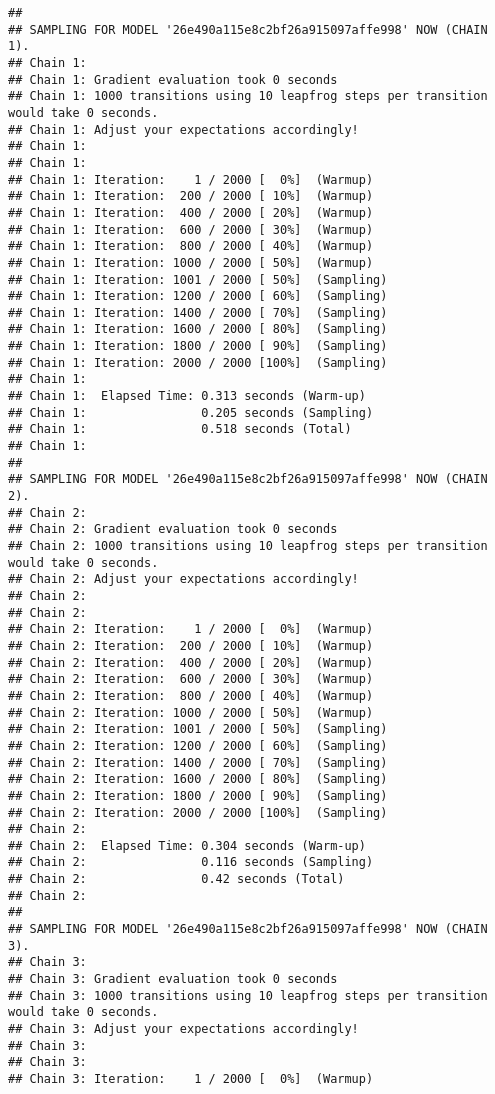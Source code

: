 \documentclass[
]{article}
\begin{document}
\begin{verbatim}
## 
## SAMPLING FOR MODEL '26e490a115e8c2bf26a915097affe998' NOW (CHAIN 1).
## Chain 1: 
## Chain 1: Gradient evaluation took 0 seconds
## Chain 1: 1000 transitions using 10 leapfrog steps per transition would take 0 seconds.
## Chain 1: Adjust your expectations accordingly!
## Chain 1: 
## Chain 1: 
## Chain 1: Iteration:    1 / 2000 [  0%]  (Warmup)
## Chain 1: Iteration:  200 / 2000 [ 10%]  (Warmup)
## Chain 1: Iteration:  400 / 2000 [ 20%]  (Warmup)
## Chain 1: Iteration:  600 / 2000 [ 30%]  (Warmup)
## Chain 1: Iteration:  800 / 2000 [ 40%]  (Warmup)
## Chain 1: Iteration: 1000 / 2000 [ 50%]  (Warmup)
## Chain 1: Iteration: 1001 / 2000 [ 50%]  (Sampling)
## Chain 1: Iteration: 1200 / 2000 [ 60%]  (Sampling)
## Chain 1: Iteration: 1400 / 2000 [ 70%]  (Sampling)
## Chain 1: Iteration: 1600 / 2000 [ 80%]  (Sampling)
## Chain 1: Iteration: 1800 / 2000 [ 90%]  (Sampling)
## Chain 1: Iteration: 2000 / 2000 [100%]  (Sampling)
## Chain 1: 
## Chain 1:  Elapsed Time: 0.313 seconds (Warm-up)
## Chain 1:                0.205 seconds (Sampling)
## Chain 1:                0.518 seconds (Total)
## Chain 1: 
## 
## SAMPLING FOR MODEL '26e490a115e8c2bf26a915097affe998' NOW (CHAIN 2).
## Chain 2: 
## Chain 2: Gradient evaluation took 0 seconds
## Chain 2: 1000 transitions using 10 leapfrog steps per transition would take 0 seconds.
## Chain 2: Adjust your expectations accordingly!
## Chain 2: 
## Chain 2: 
## Chain 2: Iteration:    1 / 2000 [  0%]  (Warmup)
## Chain 2: Iteration:  200 / 2000 [ 10%]  (Warmup)
## Chain 2: Iteration:  400 / 2000 [ 20%]  (Warmup)
## Chain 2: Iteration:  600 / 2000 [ 30%]  (Warmup)
## Chain 2: Iteration:  800 / 2000 [ 40%]  (Warmup)
## Chain 2: Iteration: 1000 / 2000 [ 50%]  (Warmup)
## Chain 2: Iteration: 1001 / 2000 [ 50%]  (Sampling)
## Chain 2: Iteration: 1200 / 2000 [ 60%]  (Sampling)
## Chain 2: Iteration: 1400 / 2000 [ 70%]  (Sampling)
## Chain 2: Iteration: 1600 / 2000 [ 80%]  (Sampling)
## Chain 2: Iteration: 1800 / 2000 [ 90%]  (Sampling)
## Chain 2: Iteration: 2000 / 2000 [100%]  (Sampling)
## Chain 2: 
## Chain 2:  Elapsed Time: 0.304 seconds (Warm-up)
## Chain 2:                0.116 seconds (Sampling)
## Chain 2:                0.42 seconds (Total)
## Chain 2: 
## 
## SAMPLING FOR MODEL '26e490a115e8c2bf26a915097affe998' NOW (CHAIN 3).
## Chain 3: 
## Chain 3: Gradient evaluation took 0 seconds
## Chain 3: 1000 transitions using 10 leapfrog steps per transition would take 0 seconds.
## Chain 3: Adjust your expectations accordingly!
## Chain 3: 
## Chain 3: 
## Chain 3: Iteration:    1 / 2000 [  0%]  (Warmup)

\end{verbatim}
\end{document}
